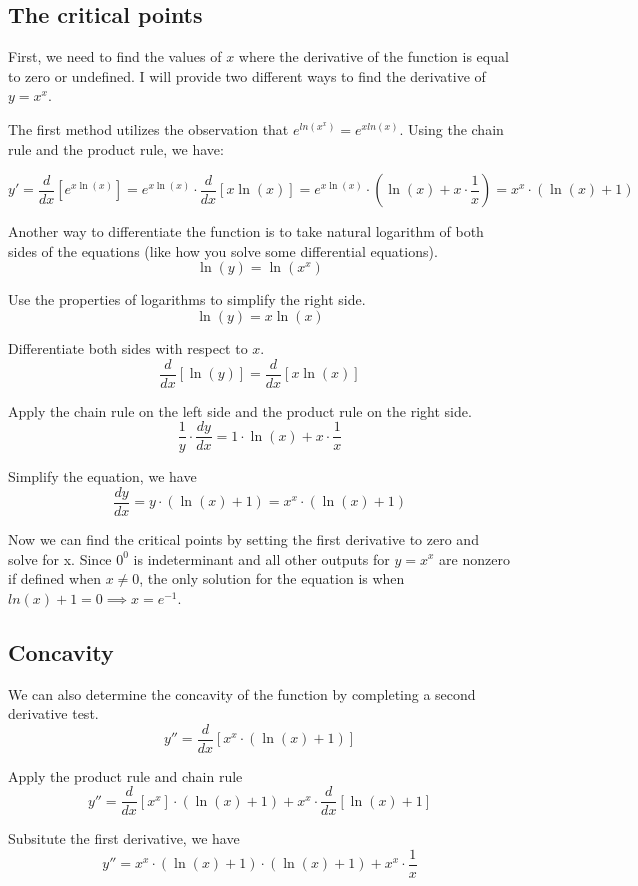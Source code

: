 \documentclass[12pt]{article}
\begin{document}
\subsection{The critical points}
First, we need to find the values of $x$ where the derivative of the function is equal to zero or undefined. I will provide two different ways to find the derivative of $y=x^x$. 

The first method utilizes the observation that $e^{ln(x^x)}=e^{xln(x)}$. Using the chain rule and the product rule, we have:

\[ y' = \frac{d}{dx}[e^{x \ln(x)}] = e^{x \ln(x)} \cdot \frac{d}{dx}[x \ln(x)] = e^{x \ln(x)} \cdot (\ln(x) + x \cdot \frac{1}{x}) = x^x \cdot (\ln(x) + 1)\]

Another way to differentiate the function is to take natural logarithm of both sides of the equations (like how you solve some differential equations).
\[ \ln(y) = \ln(x^x) \]

Use the properties of logarithms to simplify the right side.
\[ \ln(y) = x \ln(x) \]

Differentiate both sides with respect to $x$.
\[ \frac{d}{dx}[\ln(y)] = \frac{d}{dx}[x \ln(x)] \]

Apply the chain rule on the left side and the product rule on the right side.
\[ \frac{1}{y} \cdot \frac{dy}{dx} = 1 \cdot \ln(x) + x \cdot \frac{1}{x} \]

Simplify the equation, we have 
\[ \frac{dy}{dx} = y \cdot (\ln(x) + 1) = x^x \cdot (\ln(x) + 1) \]

Now we can find the critical points by setting the first derivative to zero and solve for x. Since $0^0$ is indeterminant and all other outputs for $y=x^x$ are nonzero if defined when $x\neq0$, 
the only solution for the equation is when $ln(x) + 1 = 0 \implies x = e^{-1}$. 

\subsection{Concavity}
We can also determine the concavity of the function by completing a second derivative test.
\[ y'' = \frac{d}{dx}[x^x \cdot (\ln(x) + 1)] \]

Apply the product rule and chain rule 
\[ y'' = \frac{d}{dx}[x^x] \cdot (\ln(x) + 1) + x^x \cdot \frac{d}{dx}[\ln(x) + 1] \]

Subsitute the first derivative, we have
\[ y'' = x^x \cdot (\ln(x) + 1) \cdot (\ln(x) + 1) + x^x \cdot \frac{1}{x} \]
\end{document}
